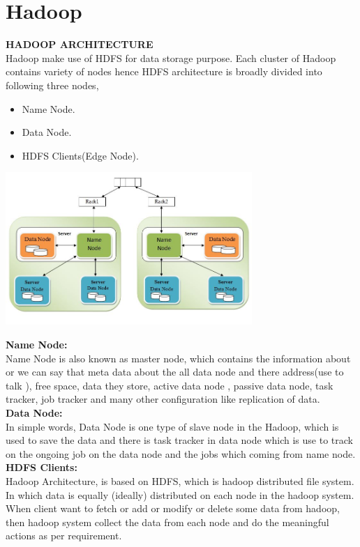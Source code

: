 \documentclass[a4paper,12pt]{report}
\begin{document}
\section{Hadoop}
\textbf{HADOOP ARCHITECTURE  }\\ 
\hspace*{\parindent}Hadoop make use of HDFS for data storage purpose. Each cluster of Hadoop contains variety of nodes hence HDFS architecture is broadly divided into following three nodes,
\begin{itemize}
	\item Name Node.
	\item Data Node.
	\item HDFS Clients(Edge Node).
\end{itemize}
\begin{center}
	\includegraphics[height=5.8cm]{images/architectureHadoop.jpg}
\end{center}
\textbf{Name Node: }\\ 
\hspace*{\parindent}Name Node is also known as master node, which contains the information about or we can say that meta data about the all data node and there address(use to talk ), free space, data they store, active data node , passive data node, task tracker, job tracker and many other configuration like  replication of data.\\
\textbf{Data Node: }\\
\hspace*{\parindent}In simple words, Data Node is one type of slave node in the Hadoop, which is used to save the data and there is task tracker in data node which is use to track on the ongoing job on the data node and the jobs which coming from name node.\\
\textbf{HDFS Clients: }\\ 
\hspace*{\parindent}Hadoop Architecture, is based on HDFS, which is hadoop distributed file system. In which data is equally (ideally) distributed on each node in the hadoop system. When client want to fetch or add or modify or delete some data from hadoop, then hadoop system collect the data from each node and do the meaningful actions as per requirement.
\end{document}
